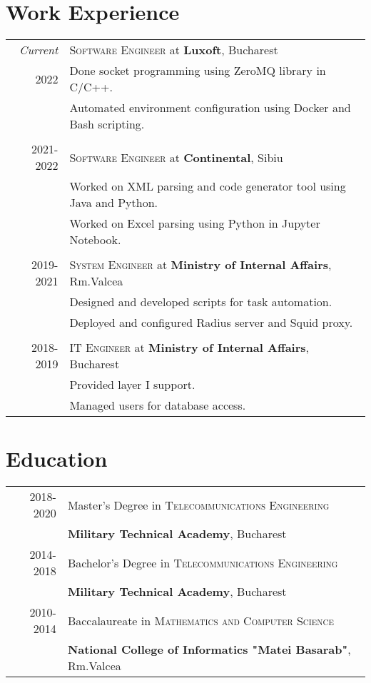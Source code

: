 \documentclass[a4paper,10pt]{article}
\begin{document}
\section{Work Experience}
\begin{tabular}{r|p{11cm}}

\emph{Current}
&\textsc{Software Engineer} at \textbf{Luxoft}, Bucharest\\
\textsc{2022}
&\footnotesize{Done socket programming using ZeroMQ library in C/C++.}\\
&\footnotesize{Automated environment configuration using Docker and Bash scripting.}\\
\multicolumn{2}{c}{}\\
\textsc{2021-2022}
&\textsc{Software Engineer} at \textbf{Continental}, Sibiu\\
&\footnotesize{Worked on XML parsing and code generator tool using Java and Python.}\\
&\footnotesize{Worked on Excel parsing using Python in Jupyter Notebook.}\\
\multicolumn{2}{c}{}\\
\textsc{2019-2021} 
  &\textsc{System Engineer} at \textbf{Ministry of Internal Affairs}, Rm.Valcea\\
&\footnotesize{
  Designed and developed scripts for task automation.}\\
&\footnotesize{
  Deployed and configured Radius server and Squid proxy.}\\
\multicolumn{2}{c}{}\\
\textsc{2018-2019} 
&\textsc{IT Engineer} at \textbf{Ministry of Internal Affairs}, Bucharest\\
&\footnotesize{Provided layer I support.}\\
&\footnotesize{Managed users for database access.}\\
\end{tabular}

\section{Education}
\begin{tabular}{rl}
\textsc{2018-2020}&Master's Degree in 
  \textsc{Telecommunications Engineering}\\
  &\textbf{Military Technical Academy}, Bucharest\\
\textsc{2014-2018}&Bachelor's Degree in
  \textsc{Telecommunications Engineering}\\
  &\textbf{Military Technical Academy}, Bucharest\\
\textsc{2010-2014}&Baccalaureate in 
  \textsc{Mathematics and Computer Science}\\
  &\textbf{National College of Informatics "Matei Basarab"}, Rm.Valcea\\
\end{tabular}
\end{document}
